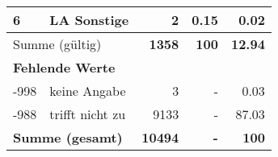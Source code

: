 \begin{longtable}{lXrrr}
     6 &
     \multicolumn{1}{X}{ LA Sonstige   } &


       \num{2} &
       \num[round-mode=places,round-precision=2]{0.15} &
         \num[round-mode=places,round-precision=2]{0.02} \\
     \midrule
     \multicolumn{2}{l}{Summe (gültig)} &
       \textbf{\num{1358}} &
     \textbf{\num{100}} &
       \textbf{\num[round-mode=places,round-precision=2]{12.94}} \\
     \multicolumn{5}{l}{\textbf{Fehlende Werte}}\\
       -998 &
       keine Angabe &
         \num{3} &
        - &
         \num[round-mode=places,round-precision=2]{0.03} \\
       -988 &
       trifft nicht zu &
         \num{9133} &
        - &
         \num[round-mode=places,round-precision=2]{87.03} \\
     \midrule
     \multicolumn{2}{l}{\textbf{Summe (gesamt)}} &
          \textbf{\num{10494}} &
        \textbf{-} &
        \textbf{\num{100}} \\
     \bottomrule
     \end{longtable}
     
